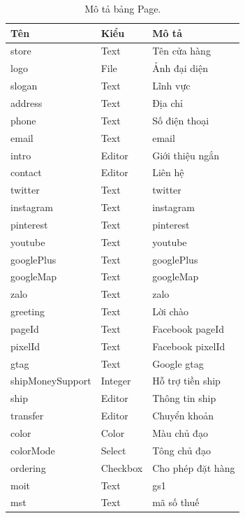 \documentclass[11pt]{report}
\begin{document}
	
	\begin{table}[h!]
		\begin{center}
			\caption{Mô tả bảng Page.}
			\begin{tabularx}{0.6\textwidth}{ |l|l|X| } 
				\hline
				Tên & Kiểu & Mô tả \\
				\hline
				store & Text & Tên cửa hàng \\
				logo & File & Ảnh đại diện \\
				slogan & Text & Lĩnh vực \\
				address & Text & Địa chỉ \\
				phone & Text & Số điện thoại \\
				email & Text & email \\
				intro & Editor & Giới thiệu ngắn \\
				contact & Editor & Liên hệ \\
				twitter & Text & twitter \\
				instagram & Text & instagram \\
				pinterest & Text & pinterest \\
				youtube & Text & youtube \\
				googlePlus & Text & googlePlus \\
				googleMap & Text & googleMap \\
				zalo & Text & zalo \\
				greeting & Text & Lời chào \\
				pageId & Text & Facebook pageId \\
				pixelId & Text & Facebook pixelId \\
				gtag & Text & Google gtag \\
				shipMoneySupport & Integer & Hỗ trợ tiền ship \\
				ship & Editor & Thông tin ship \\
				transfer & Editor & Chuyển khoản \\
				color & Color & Màu chủ đạo \\
				colorMode & Select & Tông chủ đạo \\
				ordering & Checkbox & Cho phép đặt hàng \\
				moit & Text & gs1 \\
				mst & Text & mã số thuế \\
				
				
				\hline
			\end{tabularx}
			\label{table:Page}
		\end{center}
	\end{table}
	
\end{document}
